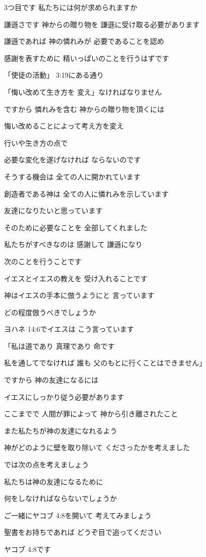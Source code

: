 \documentclass[twocolumn]{jsarticle}
\begin{document}
3つ目です
私たちには何が求められますか

謙遜さです 神からの贈り物を
謙遜に受け取る必要があります

謙遜であれば 神の憐れみが
必要であることを認め

感謝を表すために
精いっぱいのことを行うはずです

「使徒の活動」 3:19にある通り

「悔い改めて生き方を
変え」なければなりません

ですから 憐れみを含む
神からの贈り物を頂くには

悔い改めることによって考え方を変え

行いや生き方の点で

必要な変化を遂げなければ
ならないのです

そうする機会は
全ての人に開かれています

創造者である神は
全ての人に憐れみを示しています

友達になりたいと思っています

そのために必要なことを
全部してくれました

私たちがすべきなのは
感謝して 謙遜になり

次のことを行うことです

イエスとイエスの教えを
受け入れることです

神はイエスの手本に倣うようにと
言っています

どの程度倣うべきでしょうか

ヨハネ 14:6でイエスは
こう言っています

「私は道であり 真理であり 命です

私を通してでなければ 誰も
父のもとに行くことはできません」

ですから 神の友達になるには

イエスにしっかり従う必要があります

ここまでで 人間が罪によって
神から引き離されたこと

また私たちが神の友達になれるよう

神がどのように壁を取り除いて
くださったかを考えました

では次の点を考えましょう

私たちは神の友達になるために

何をしなければならないでしょうか

ご一緒にヤコブ 4:8を開いて
考えてみましょう

聖書をお持ちであれば
どうぞ目で追ってください

ヤコブ 4:8です
\end{document}
